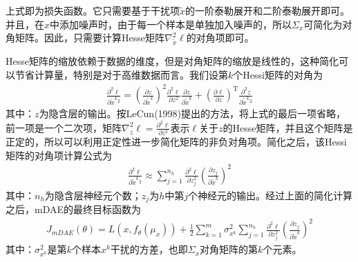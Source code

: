         上式即为损失函数。它只需要基于干扰项$\tilde{x}$的一阶泰勒展开和二阶泰勒展开即可。并且，在$x$中添加噪声时，由于每一个样本是单独加入噪声的，所以$\Sigma_x$可简化为对角矩阵。因此，只需要计算Hesse矩阵$\nabla_{\tilde{x}}^2 \ell$的对角项即可。
        \par
        Hesse矩阵的缩放依赖于数据的维度，但是对角矩阵的缩放是线性的，这种简化可以节省计算量，特别是对于高维数据而言。我们设第$k$个Hessi矩阵的对角为
        \begin{align*}
        \frac{\partial ^2\ell}{\partial \tilde{x}^k{}^2} = \left( \frac{\partial z}{\partial \tilde{x}^k} \right) ^2 \frac{\partial ^2\ell}{\partial z^2} \frac{\partial z}{\partial \tilde{x}^k} +  \left( \frac{\partial \ell}{\partial z} \right) ^\mathrm{T}\frac{\partial ^2z}{\partial \tilde{x}^k{}^2}
        \end{align*}
        其中：$z$为隐含层的输出。按LeCun(1998)提出的方法，将上式的最后一项省略，前一项是一个二次项，矩阵$\nabla_z^2\ell = \frac{\partial ^2\ell}{\partial z^2}$表示$\ell$关于$z$的Hesse矩阵，并且这个矩阵是正定的，所以可以利用正定性进一步简化矩阵的非负对角项。简化之后，该Hessi矩阵的对角项计算公式为
        \begin{align*}
        \frac{\partial ^2\ell}{\partial \tilde{x}^k{}^2} \approx \sum_{j=1}^{n_h}\frac{\partial ^2 \ell}{\partial z_j^2} \left( \frac{\partial z_j}{\partial \tilde{x}^k} \right) ^2
        \end{align*}
        其中：$n_h$为隐含层神经元个数；$z_j$为$h$中第$j$个神经元的输出。经过上面的简化计算之后，mDAE的最终目标函数为
        \begin{align*}
        J_{mDAE}(\theta) = L(x,f_\theta(\mu_x)) + \frac{1}{2}\sum_{k=1}^m \sigma_{x^k}^2 \sum_{j=1}^{n_h}\frac{\partial ^2 \ell}{\partial z_j^2} \left( \frac{\partial z_j}{\partial \tilde{x}^k} \right) ^2
        \end{align*}
        其中：$\sigma_{x^k}^2$是第$k$个样本$x^k$干扰的方差，也即$\Sigma_x$对角矩阵的第$k$个元素。

